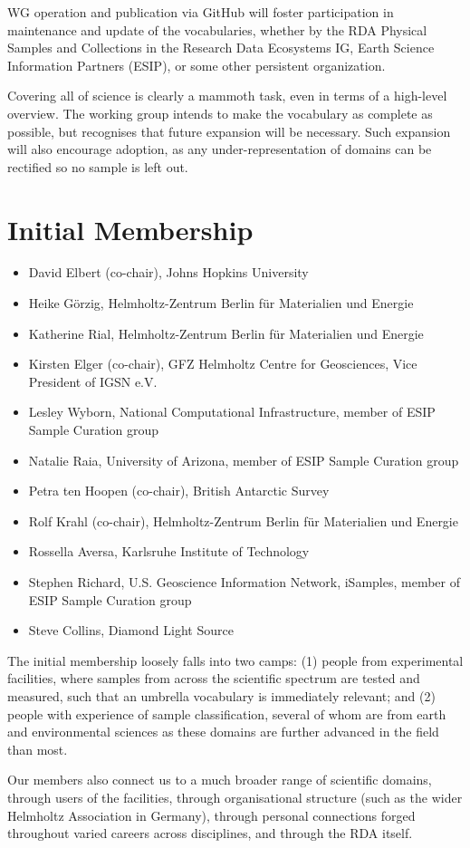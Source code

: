 \documentclass{scrartcl}
\begin{document}
WG operation and publication via GitHub will foster participation in
maintenance and update of the vocabularies, whether by the RDA
Physical Samples and Collections in the Research Data Ecosystems IG,
Earth Science Information Partners (ESIP), or some other persistent
organization.

Covering all of science is clearly a mammoth task, even in terms of a
high-level overview.  The working group intends to make the vocabulary
as complete as possible, but recognises that future expansion will be
necessary.  Such expansion will also encourage adoption, as any
under-representation of domains can be rectified so no sample is left
out.

\section{Initial Membership}

\begin{itemize}
\item David Elbert (co-chair), Johns Hopkins University
\item Heike Görzig,
  Helmholtz-Zentrum Berlin für Materialien und Energie
\item Katherine Rial,
  Helmholtz-Zentrum Berlin für Materialien und Energie
\item Kirsten Elger (co-chair),
  GFZ Helmholtz Centre for Geosciences, Vice President of IGSN e.V.
\item Lesley Wyborn,
  National Computational Infrastructure, member of ESIP Sample Curation group
\item Natalie Raia,
  University of Arizona, member of ESIP Sample Curation group
\item Petra ten Hoopen (co-chair), British Antarctic Survey
\item Rolf Krahl (co-chair),
  Helmholtz-Zentrum Berlin für Materialien und Energie
\item Rossella Aversa, Karlsruhe Institute of Technology
\item Stephen Richard,
  U.S. Geoscience Information Network, iSamples,
  member of ESIP Sample Curation group
\item Steve Collins, Diamond Light Source
\end{itemize}

The initial membership loosely falls into two camps: (1) people from
experimental facilities, where samples from across the scientific
spectrum are tested and measured, such that an umbrella vocabulary is
immediately relevant; and (2) people with experience of sample
classification, several of whom are from earth and environmental
sciences as these domains are further advanced in the field than most.

Our members also connect us to a much broader range of scientific
domains, through users of the facilities, through organisational
structure (such as the wider Helmholtz Association in Germany),
through personal connections forged throughout varied careers across
disciplines, and through the RDA itself.
\end{document}
